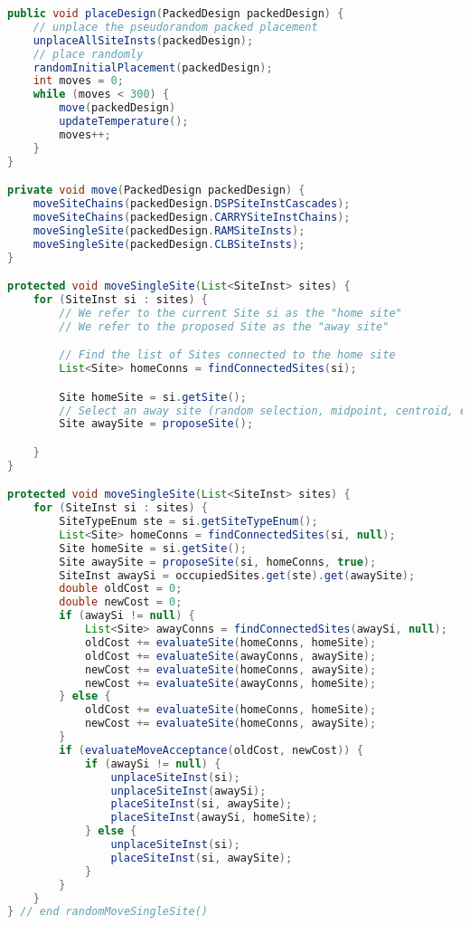 \begin{lstlisting}[language=java, caption={Simulated Annealing pseudocode}, label={lst:sa_pseudocode}]
public void placeDesign(PackedDesign packedDesign) {
    // unplace the pseudorandom packed placement
    unplaceAllSiteInsts(packedDesign);
    // place randomly
    randomInitialPlacement(packedDesign);
    int moves = 0;
    while (moves < 300) {
        move(packedDesign)
        updateTemperature();
        moves++;
    }
}

private void move(PackedDesign packedDesign) {
    moveSiteChains(packedDesign.DSPSiteInstCascades);
    moveSiteChains(packedDesign.CARRYSiteInstChains);
    moveSingleSite(packedDesign.RAMSiteInsts);
    moveSingleSite(packedDesign.CLBSiteInsts);
}

protected void moveSingleSite(List<SiteInst> sites) {
    for (SiteInst si : sites) {
        // We refer to the current Site si as the "home site"
        // We refer to the proposed Site as the "away site"

        // Find the list of Sites connected to the home site
        List<Site> homeConns = findConnectedSites(si);

        Site homeSite = si.getSite();
        // Select an away site (random selection, midpoint, centroid, etc.)
        Site awaySite = proposeSite();

    }
}

protected void moveSingleSite(List<SiteInst> sites) {
    for (SiteInst si : sites) {
        SiteTypeEnum ste = si.getSiteTypeEnum();
        List<Site> homeConns = findConnectedSites(si, null);
        Site homeSite = si.getSite();
        Site awaySite = proposeSite(si, homeConns, true);
        SiteInst awaySi = occupiedSites.get(ste).get(awaySite);
        double oldCost = 0;
        double newCost = 0;
        if (awaySi != null) {
            List<Site> awayConns = findConnectedSites(awaySi, null);
            oldCost += evaluateSite(homeConns, homeSite);
            oldCost += evaluateSite(awayConns, awaySite);
            newCost += evaluateSite(homeConns, awaySite);
            newCost += evaluateSite(awayConns, homeSite);
        } else {
            oldCost += evaluateSite(homeConns, homeSite);
            newCost += evaluateSite(homeConns, awaySite);
        }
        if (evaluateMoveAcceptance(oldCost, newCost)) {
            if (awaySi != null) {
                unplaceSiteInst(si);
                unplaceSiteInst(awaySi);
                placeSiteInst(si, awaySite);
                placeSiteInst(awaySi, homeSite);
            } else {
                unplaceSiteInst(si);
                placeSiteInst(si, awaySite);
            }
        }
    }
} // end randomMoveSingleSite()
\end{lstlisting}

